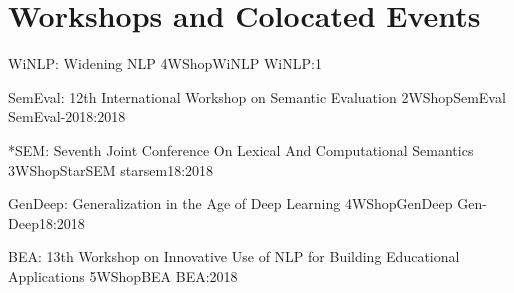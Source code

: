 \chapter[Workshops and Colocated Events: \daydate]{Workshops and Colocated Events}
\thispagestyle{emptyheader}





\begin{wsschedule}
  {WiNLP: Widening NLP}
  {4}{WShopWiNLP}
  {WiNLP:1}
  {\WShopLocWiNLP}
  
\end{wsschedule}


\begin{wsschedule}
  {SemEval: 12th International Workshop on Semantic Evaluation}
  {2}{WShopSemEval}
{SemEval-2018:2018}
  {\WShopLocSemEval}
  
\end{wsschedule}

 \begin{wsschedule}
   {*SEM: Seventh Joint Conference On Lexical And Computational Semantics}
   {3}{WShopStarSEM}
   {starsem18:2018}
   {\WShopLocStarSEM}
   
 \end{wsschedule}


 \clearpage
{}

\begin{wsschedule}
  {GenDeep: Generalization in the Age of Deep Learning}
  {4}{WShopGenDeep}
  {Gen-Deep18:2018}
  {\WShopLocGenDeep}
  
\end{wsschedule}

\begin{wsschedule}
  {BEA: 13th Workshop on Innovative Use of NLP for Building Educational Applications}
  {5}{WShopBEA}
  {BEA:2018}
  {\WShopLocBEA}
  
\end{wsschedule}

